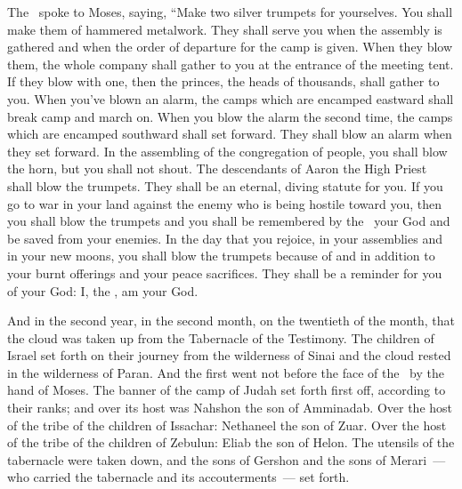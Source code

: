 
\begin{inparaenum}
   The \lord\ spoke to Moses, saying,%
   ``Make two silver trumpets for yourselves. You shall make them of hammered metalwork. They shall serve you when the assembly is gathered and when the order of departure for the camp is given.%
   When they blow them, the whole company shall gather to you at the entrance of the meeting tent.%
   If they blow with one, then the princes, the heads of thousands, shall gather to you.%
   When you've blown an alarm, the camps which are encamped eastward shall break camp and march on.%
   When you blow the alarm the second time, the camps which are encamped southward shall set forward. They shall blow an alarm when they set forward.%
   In the assembling of the congregation of people, you shall blow the horn, but you shall not shout.%
   The descendants of Aaron the High Priest shall blow the trumpets. They shall be an eternal, diving statute for you.%
   If you go to war in your land against the enemy who is being hostile toward you, then you shall blow the trumpets and you shall be remembered by the \lord\ your God and be saved from your enemies.%
   In the day that you rejoice, in your assemblies and in your new moons, you shall blow the trumpets because of and in addition to your burnt offerings and your peace sacrifices. They shall be a reminder for you of your God: I, the \lord, am your God.%
  
   And in the second year, in the second month, on the twentieth of the month, that the cloud was taken up from the Tabernacle of the Testimony.%
   The children of Israel set forth on their journey from the wilderness of Sinai and the cloud rested in the wilderness of Paran.%
   And the first went not before the face of the \lord\ by the hand of Moses.%
   The banner of the camp of Judah set forth first off, according to their ranks; and over its host was Nahshon the son of Amminadab.%
   Over the host of the tribe of the children of Issachar: Nethaneel the son of Zuar.%
   Over the host of the tribe of the children of Zebulun: Eliab the son of Helon.%
   The utensils of the tabernacle were taken down, and the sons of Gershon and the sons of Merari~--- who carried the tabernacle and its accouterments~--- set forth.%
  

\end{inparaenum}
